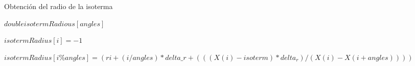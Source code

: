 \documentclass[a4paper]{article}
\begin{document}
\begin{algorithm}
\caption{Obtención del radio de la isoterma}\label{euclid}
\begin{algorithmic}[1]



    \State $double isotermRadious[angles]$

      \State $isotermRadius[i] = -1$
    \EndFor

       \State $isotermRadius[i \% angles] = (ri + (i / angles)*delta\_r + (((X(i) - isoterm) * delta_r)/ (X(i) - X(i+angles)) ))$
      \EndIf
    \EndFor

  \EndFunction

\end{algorithmic}
\end{algorithm}
\end{document}
